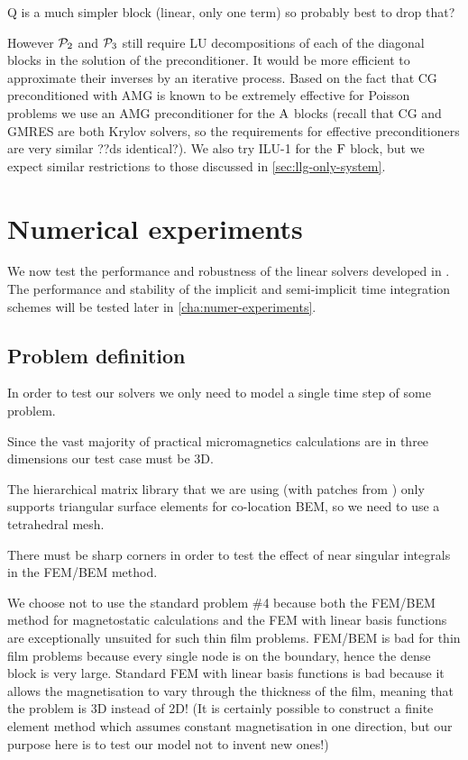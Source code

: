 Q is a much simpler block (linear, only one term) so probably best to drop that?


However $\mathcal{P}_2$ and $\mathcal{P}_3$ still require LU decompositions of each of the diagonal blocks in the solution of the preconditioner.
It would be more efficient to approximate their inverses by an iterative process.
Based on the fact that CG preconditioned with AMG is known to be extremely effective for Poisson problems we use an AMG preconditioner for the $\mathrm{A}$ blocks (recall that CG and GMRES are both Krylov solvers, so the requirements for effective preconditioners are very similar ??ds identical?).
We also try ILU-1 for the $\mathrm{F}$ block, but we expect similar restrictions to those discussed in \cref{sec:llg-only-system}.




\section{Numerical experiments}

We now test the performance and robustness of the linear solvers developed in .
The performance and stability of the implicit and semi-implicit time integration schemes will be tested later in \cref{cha:numer-experiments}.


\subsection{Problem definition}

In order to test our solvers we only need to model a single time step of some problem.

Since the vast majority of practical micromagnetics calculations are in three dimensions our test case must be 3D.

The hierarchical matrix library that we are using (\hlib with patches from \nmag) only supports triangular surface elements for co-location BEM, so we need to use a tetrahedral mesh.

There must be sharp corners in order to test the effect of near singular integrals in the FEM/BEM method.

We choose not to use the \mumag standard problem \#4 because both the FEM/BEM method for magnetostatic calculations and the FEM with linear basis functions are exceptionally unsuited for such thin film problems.
FEM/BEM is bad for thin film problems because every single node is on the boundary, hence the dense block is very large.
Standard FEM with linear basis functions is bad because it allows the magnetisation to vary through the thickness of the film, meaning that the problem is 3D instead of 2D!
(It is certainly possible to construct a finite element method which assumes constant magnetisation in one direction, but our purpose here is to test our model not to invent new ones!)

